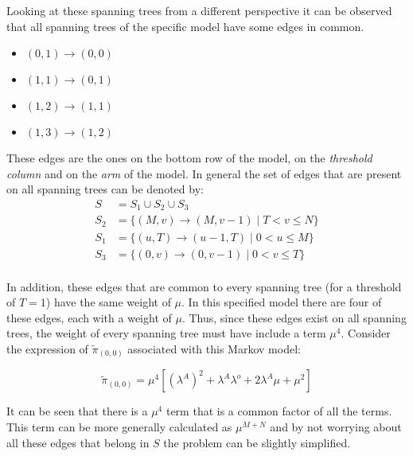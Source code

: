 Looking at these spanning trees from a different perspective it can be observed 
that all spanning trees of the specific model have some edges in common. 

\begin{multicols}{4}
    \begin{itemize}
        \item \((0,1) \rightarrow (0,0)\)
        \item \((1,1) \rightarrow (0,1)\)
        \item \((1,2) \rightarrow (1,1)\)
        \item \((1,3) \rightarrow (1,2)\)
    \end{itemize}
\end{multicols}

These edges are the ones on the bottom row of the model, on the 
\textit{threshold column} and on the \textit{arm} of the model. 
In general the set of edges that are present on all spanning trees can be 
denoted by:
\begin{align} \label{eq:common_edges_set}
    S &= S_1 \cup S_2 \cup S_3 \nonumber\\
    S_2 &= \{(M,v) \rightarrow (M,v-1) \; | \; T < v \leq N\} \nonumber \\
    S_1 &= \{(u,T) \rightarrow (u-1,T) \; | \; 0 < u \leq M\} \nonumber \\
    S_3 &= \{(0,v) \rightarrow (0,v-1) \; | \; 0 < v \leq T\} \nonumber \\
\end{align}

In addition, these edges that are common to every spanning tree (for a threshold 
of \(T=1\)) have the same weight of \(\mu\). 
In this specified model there are four of these edges, each with a weight of 
\(\mu\). 
Thus, since these edges exist on all spanning trees, the weight of every spanning 
tree must have include a term \(\mu^4\). 
Consider the expression of \(\tilde{\pi}_{(0,0)}\) associated with this Markov 
model:

\begin{equation}\label{eq:pi_00_rate_example}
    \tilde{\pi}_{(0,0)} = \mu^4[(\lambda^A)^2 + \lambda^A \lambda^o 
    + 2\lambda^A \mu + \mu^2] 
\end{equation}

It can be seen that there is a \(\mu^4\) term that is a common factor of all the
 terms. 
This term can be more generally calculated as \(\mu^{M+N}\) and by not worrying 
about all these edges that belong in \(S\) the problem can be slightly simplified.

